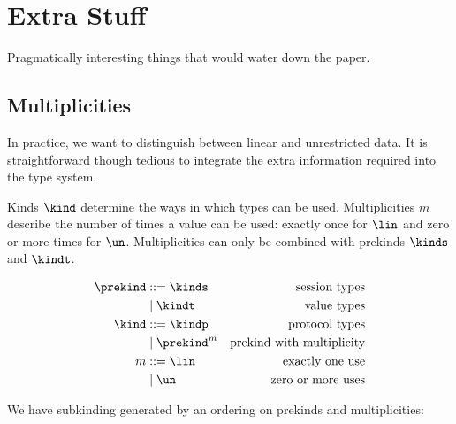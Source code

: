 \appendix

\section{Extra Stuff}
\label{sec:extra-stuff}

Pragmatically interesting things that would water down the paper.

\subsection{Multiplicities}
\label{sec:multiplicities}

In practice, we want to distinguish between linear and unrestricted
data. It is straightforward though tedious to integrate the extra
information required into the type system.

Kinds $\kind$ determine the ways in which types can be used. 
Multiplicities $m$ describe the number of times a value can be used: exactly once
for $\lin$ and zero or more times for $\un$. Multiplicities can only
be combined with prekinds $\kinds$ and $\kindt$.

\begin{align*}
  \prekind &::= \kinds & \text{session types} \\
           & \mid \kindt & \text{value types} \\
  \kind &::= \kindp  & \text{protocol types} \\
   &\mid \prekind^m  & \text{prekind with multiplicity} \\
  m &::= \lin & \text{exactly one use} \\
  & \mid \un & \text{zero or more uses}
\end{align*}


We have subkinding generated by an ordering on prekinds and
multiplicities:


\begin{center}
  \qquad
  \qquad
\end{center}


